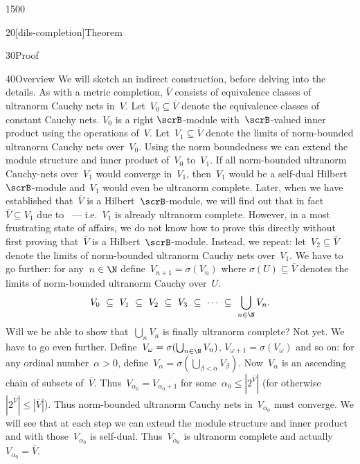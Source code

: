 \begin{parsec}{1500}
\begin{point}{20}[dils-completion]{Theorem}
\begin{point}{30}{Proof}
\begin{point}{40}{Overview}
We will sketch an indirect construction,
    before delving into the details.
As with a metric completion,
    $\overline{V}$ consists of equivalence classes of ultranorm
        Cauchy nets in~$V$.
Let~$V_0\subseteq \overline{V}$
    denote the equivalence classes of constant Cauchy nets.
$V_0$ is a right $\scrB$-module with~$\scrB$-valued inner product
    using the operations of~$V$.
Let~$V_1\subseteq \overline{V}$ denote
    the limits of norm-bounded ultranorm Cauchy nets over~$V_0$.
Using the norm boundedness we can extend
    the module structure and inner product of~$V_0$ to~$V_1$.
If all norm-bounded ultranorm Cauchy-nets over~$V_1$ would
    converge in~$V_1$,
    then~$V_1$ would be a self-dual Hilbert~$\scrB$-module
    and~$V_1$ would even be ultranorm complete.
Later, when we have established that~$\overline{V}$ is a Hilbert~$\scrB$-module,
    we will find out that in fact~$\overline{V} \subseteq V_1$
    due to~
    ---
    i.e.~$V_1$ is already ultranorm complete.
However, in a most frustrating state of affairs,
    we do not know how to prove this directly
    without first proving that~$\overline{V}$ is a Hilbert~$\scrB$-module.
Instead, we repeat: let~$V_2 \subseteq \overline{V}$
    denote the limits of norm-bounded ultranorm Cauchy nets over~$V_1$.
We have to go further:
    for any~$n \in \N$
    define~$V_{n+1} = \sigma(V_n)$
    where $\sigma(U)\subseteq \overline{V}$
    denotes the limits of norm-bounded ultranorm Cauchy over~$U$.
\begin{equation*}
   V_0 \ \subseteq \ V_1 \ \subseteq\  V_2\  \subseteq\  V_3 \ \subseteq \ \cdots\ \subseteq \ \bigcup_{n \in \N} V_n.
\end{equation*}
Will we be able to show that~$\bigcup_n V_n$ is finally ultranorm complete?
Not yet.
We have to go even further.
Define~$V_\omega = \sigma(\bigcup_{n \in \N} V_n)$,
$V_{\omega+1} = \sigma(V_\omega)$
and so on:
for any ordinal number~$\alpha > 0$,
    define~$V_\alpha = \sigma(\bigcup_{\beta < \alpha} V_\beta)$.
Now~$V_\alpha$
    is an ascending chain of subsets of~$\overline{V}$.
    Thus~$V_{\alpha_0} = V_{{\alpha_0}+1}$
for some~$\alpha_0 \leq |2^{\overline{V}}|$
(for otherwise~$|2^{\overline{V}}| \leq |\overline{V}|$).
Thus norm-bounded ultranorm Cauchy nets in~$V_{\alpha_0}$
    must converge.
We will see that at each step we can extend the module structure
    and inner product and with those~$V_{\alpha_0}$ is self-dual.
    Thus~$V_{\alpha_0}$ is ultranorm complete
    and actually~$V_{\alpha_0} = \overline{V}$.
\begin{equation*}

\end{equation*}
\end{point}
\end{point}
\end{point}
\end{parsec}
